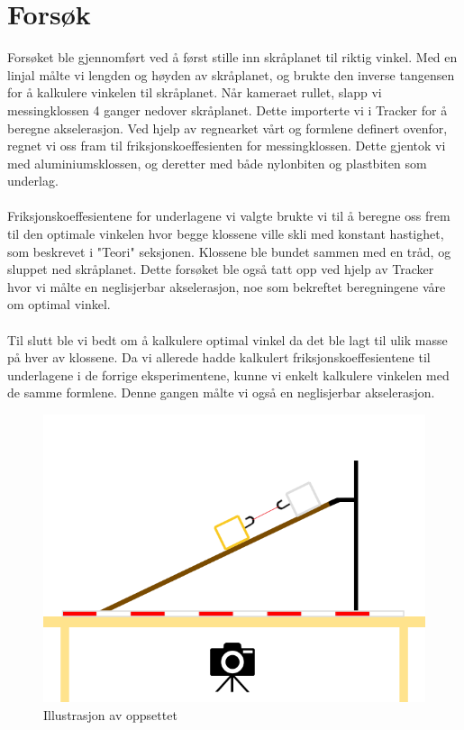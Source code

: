 \documentclass[10pt,a4paper]{report}
\begin{document}
\section*{Forsøk}
Forsøket ble gjennomført ved å først stille inn skråplanet til riktig vinkel. Med en linjal målte vi lengden og høyden av skråplanet, og brukte den inverse tangensen for å kalkulere vinkelen til skråplanet. Når kameraet rullet, slapp vi messingklossen 4 ganger nedover skråplanet. Dette importerte vi i Tracker for å beregne akselerasjon. Ved hjelp av regnearket vårt og formlene definert ovenfor, regnet vi oss fram til friksjonskoeffesienten for messingklossen. Dette gjentok vi med aluminiumsklossen, og deretter med både nylonbiten og plastbiten som underlag. \\
\\Friksjonskoeffesientene for underlagene vi valgte brukte vi til å beregne oss frem til den optimale vinkelen hvor begge klossene ville skli med konstant hastighet, som beskrevet i "Teori" seksjonen. Klossene ble bundet sammen med en tråd, og sluppet ned skråplanet. Dette forsøket ble også tatt opp ved hjelp av Tracker hvor vi målte en neglisjerbar akselerasjon, noe som bekreftet beregningene våre om optimal vinkel.\\
\\Til slutt ble vi bedt om å kalkulere optimal vinkel da det ble lagt til ulik masse på hver av klossene. Da vi allerede hadde kalkulert friksjonskoeffesientene til underlagene i de forrige eksperimentene, kunne vi enkelt kalkulere vinkelen med de samme formlene. Denne gangen målte vi også en neglisjerbar akselerasjon.

\begin{figure}
\centerline{\includegraphics[scale=0.5]{oppsett}}
\caption{Illustrasjon av oppsettet}
\label{oppsett}
\end{figure}
\end{document}
